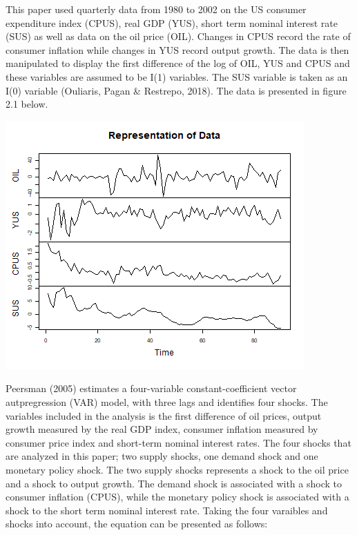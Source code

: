 \documentclass[11pt,preprint, authoryear]{elsarticle}
\let\origfigure\figure
\let\endorigfigure\endfigure
\renewenvironment{figure}[1][2] {
    \expandafter\origfigure\expandafter[H]
} {
    \endorigfigure
}
\numberwithin{equation}{section}
\numberwithin{figure}{section}
\numberwithin{table}{section}
\begin{document}
This paper used quarterly data from 1980 to 2002 on the US consumer
expenditure index (CPUS), real GDP (YUS), short term nominal interest
rate (SUS) as well as data on the oil price (OIL). Changes in CPUS
record the rate of consumer inflation while changes in YUS record output
growth. The data is then manipulated to display the first difference of
the log of OIL, YUS and CPUS and these variables are assumed to be I(1)
variables. The SUS variable is taken as an I(0) variable (Ouliaris,
Pagan \& Restrepo, 2018). The data is presented in figure 2.1 below.

\begin{figure}[H]

{\centering \includegraphics{replication_files/figure-latex/Figure1-1} 

}

\caption{Data\label{Figure1}}\label{fig:Figure1}
\end{figure}

Peersman (2005) estimates a four-variable constant-coefficient vector
autpregression (VAR) model, with three lags and identifies four shocks.
The variables included in the analysis is the first difference of oil
prices, output growth measured by the real GDP index, consumer inflation
measured by consumer price index and short-term nominal interest rates.
The four shocks that are analyzed in this paper; two supply shocks, one
demand shock and one monetary policy shock. The two supply shocks
represents a shock to the oil price and a shock to output growth. The
demand shock is associated with a shock to consumer inflation (CPUS),
while the monetary policy shock is associated with a shock to the short
term nominal interest rate. Taking the four varaibles and shocks into
account, the equation can be presented as follows:
\end{document}
